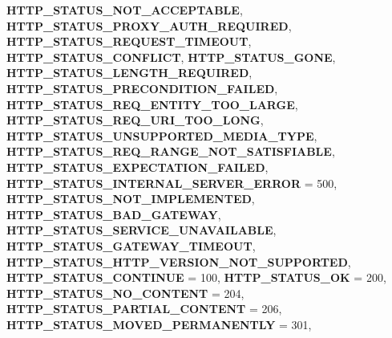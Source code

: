 \begin{DoxyCompactItemize}
{\bfseries H\+T\+T\+P\+\_\+\+S\+T\+A\+T\+U\+S\+\_\+\+N\+O\+T\+\_\+\+A\+C\+C\+E\+P\+T\+A\+B\+LE}, 
{\bfseries H\+T\+T\+P\+\_\+\+S\+T\+A\+T\+U\+S\+\_\+\+P\+R\+O\+X\+Y\+\_\+\+A\+U\+T\+H\+\_\+\+R\+E\+Q\+U\+I\+R\+ED}, 
{\bfseries H\+T\+T\+P\+\_\+\+S\+T\+A\+T\+U\+S\+\_\+\+R\+E\+Q\+U\+E\+S\+T\+\_\+\+T\+I\+M\+E\+O\+UT}, 
{\bfseries H\+T\+T\+P\+\_\+\+S\+T\+A\+T\+U\+S\+\_\+\+C\+O\+N\+F\+L\+I\+CT}, 
\newline
{\bfseries H\+T\+T\+P\+\_\+\+S\+T\+A\+T\+U\+S\+\_\+\+G\+O\+NE}, 
{\bfseries H\+T\+T\+P\+\_\+\+S\+T\+A\+T\+U\+S\+\_\+\+L\+E\+N\+G\+T\+H\+\_\+\+R\+E\+Q\+U\+I\+R\+ED}, 
{\bfseries H\+T\+T\+P\+\_\+\+S\+T\+A\+T\+U\+S\+\_\+\+P\+R\+E\+C\+O\+N\+D\+I\+T\+I\+O\+N\+\_\+\+F\+A\+I\+L\+ED}, 
{\bfseries H\+T\+T\+P\+\_\+\+S\+T\+A\+T\+U\+S\+\_\+\+R\+E\+Q\+\_\+\+E\+N\+T\+I\+T\+Y\+\_\+\+T\+O\+O\+\_\+\+L\+A\+R\+GE}, 
\newline
{\bfseries H\+T\+T\+P\+\_\+\+S\+T\+A\+T\+U\+S\+\_\+\+R\+E\+Q\+\_\+\+U\+R\+I\+\_\+\+T\+O\+O\+\_\+\+L\+O\+NG}, 
{\bfseries H\+T\+T\+P\+\_\+\+S\+T\+A\+T\+U\+S\+\_\+\+U\+N\+S\+U\+P\+P\+O\+R\+T\+E\+D\+\_\+\+M\+E\+D\+I\+A\+\_\+\+T\+Y\+PE}, 
{\bfseries H\+T\+T\+P\+\_\+\+S\+T\+A\+T\+U\+S\+\_\+\+R\+E\+Q\+\_\+\+R\+A\+N\+G\+E\+\_\+\+N\+O\+T\+\_\+\+S\+A\+T\+I\+S\+F\+I\+A\+B\+LE}, 
{\bfseries H\+T\+T\+P\+\_\+\+S\+T\+A\+T\+U\+S\+\_\+\+E\+X\+P\+E\+C\+T\+A\+T\+I\+O\+N\+\_\+\+F\+A\+I\+L\+ED}, 
\newline
{\bfseries H\+T\+T\+P\+\_\+\+S\+T\+A\+T\+U\+S\+\_\+\+I\+N\+T\+E\+R\+N\+A\+L\+\_\+\+S\+E\+R\+V\+E\+R\+\_\+\+E\+R\+R\+OR} = 500, 
{\bfseries H\+T\+T\+P\+\_\+\+S\+T\+A\+T\+U\+S\+\_\+\+N\+O\+T\+\_\+\+I\+M\+P\+L\+E\+M\+E\+N\+T\+ED}, 
{\bfseries H\+T\+T\+P\+\_\+\+S\+T\+A\+T\+U\+S\+\_\+\+B\+A\+D\+\_\+\+G\+A\+T\+E\+W\+AY}, 
{\bfseries H\+T\+T\+P\+\_\+\+S\+T\+A\+T\+U\+S\+\_\+\+S\+E\+R\+V\+I\+C\+E\+\_\+\+U\+N\+A\+V\+A\+I\+L\+A\+B\+LE}, 
\newline
{\bfseries H\+T\+T\+P\+\_\+\+S\+T\+A\+T\+U\+S\+\_\+\+G\+A\+T\+E\+W\+A\+Y\+\_\+\+T\+I\+M\+E\+O\+UT}, 
{\bfseries H\+T\+T\+P\+\_\+\+S\+T\+A\+T\+U\+S\+\_\+\+H\+T\+T\+P\+\_\+\+V\+E\+R\+S\+I\+O\+N\+\_\+\+N\+O\+T\+\_\+\+S\+U\+P\+P\+O\+R\+T\+ED}, 
{\bfseries H\+T\+T\+P\+\_\+\+S\+T\+A\+T\+U\+S\+\_\+\+C\+O\+N\+T\+I\+N\+UE} = 100, 
{\bfseries H\+T\+T\+P\+\_\+\+S\+T\+A\+T\+U\+S\+\_\+\+OK} = 200, 
\newline
{\bfseries H\+T\+T\+P\+\_\+\+S\+T\+A\+T\+U\+S\+\_\+\+N\+O\+\_\+\+C\+O\+N\+T\+E\+NT} = 204, 
{\bfseries H\+T\+T\+P\+\_\+\+S\+T\+A\+T\+U\+S\+\_\+\+P\+A\+R\+T\+I\+A\+L\+\_\+\+C\+O\+N\+T\+E\+NT} = 206, 
{\bfseries H\+T\+T\+P\+\_\+\+S\+T\+A\+T\+U\+S\+\_\+\+M\+O\+V\+E\+D\+\_\+\+P\+E\+R\+M\+A\+N\+E\+N\+T\+LY} = 301, 

\end{DoxyCompactItemize}
